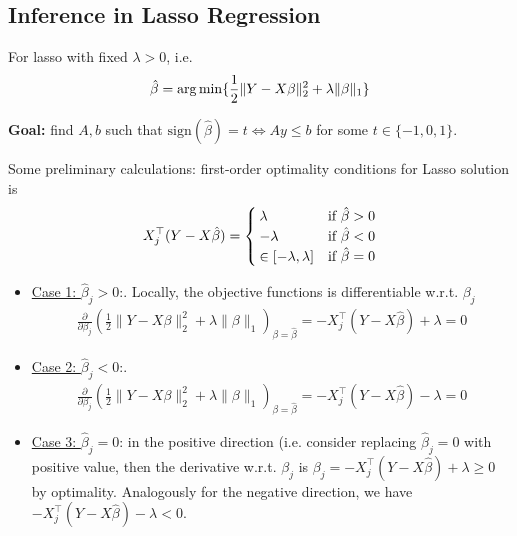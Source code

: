 \subsection{Inference in Lasso Regression}
For lasso with fixed $\lambda > 0$, i.e. 
$$
\hat{\beta} = \operatorname*{arg\,min}\{ \frac{1}{2}\lVert Y-X\beta\rVert_2^2 + \lambda\rVert \beta\lVert_1\}$$

\textbf{Goal:} find $A,b$ such that $\text{sign}(\hat\beta) = t \iff Ay\leq b$ for some $t\in\{-1,0,1\}$. 

Some preliminary calculations: first-order optimality conditions for Lasso solution is
$$
X^\top_j(Y-X\hat{\beta}) = \begin{cases}
    \lambda & \textup{if } \hat\beta > 0 \\
    -\lambda & \textup{if } \hat\beta < 0 \\
    \in [-\lambda, \lambda] & \textup{if } \hat\beta = 0 \\
\end{cases}
$$

\begin{pr}
    \begin{itemize}
        \item \underline{Case 1: $\hat{\beta}_j > 0$}:. Locally, the objective functions is differentiable w.r.t. $\beta_j$
        \begin{align*}
            \frac{\partial}{\partial \beta_j} \left( \frac{1}{2}\lVert Y-X\beta\rVert_2^2 + \lambda\rVert \beta\lVert_1\right)_{\beta=\hat{\beta}} = -X_j^\top(Y-X\hat{\beta}) +\lambda = 0
        \end{align*}
        \item \underline{Case 2: $\hat{\beta}_j < 0$}:. 
        \begin{align*}
            \frac{\partial}{\partial \beta_j} \left( \frac{1}{2}\lVert Y-X\beta\rVert_2^2 + \lambda\rVert \beta\lVert_1\right)_{\beta=\hat{\beta}} = -X_j^\top(Y-X\hat{\beta}) -\lambda = 0
        \end{align*}
        \item \underline{Case 3: $\hat{\beta}_j = 0$}: in the positive direction (i.e. consider replacing $\hat{\beta}_j = 0$ with positive value, then the derivative w.r.t. $\beta_j$ is  $\beta_j = -X_j^\top(Y-X\hat\beta)+\lambda\geq 0$ by optimality. Analogously for the negative direction, we have $-X_j^\top (Y - X\hat{\beta}) - \lambda < 0$.
\end{itemize}
\end{pr}

